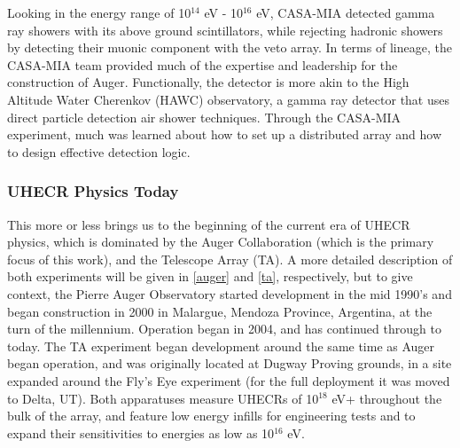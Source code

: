 Looking in the energy range of 10$^{14}$ eV - 10$^{16}$ eV, CASA-MIA detected gamma ray showers with its above ground scintillators, while rejecting hadronic showers by detecting their muonic component with the veto array. In terms of lineage, the CASA-MIA team provided much of the expertise and leadership for the construction of Auger. Functionally, the detector is more akin to the High Altitude Water Cherenkov (HAWC) observatory, a gamma ray detector that uses direct particle detection air shower techniques. Through the CASA-MIA experiment, much was learned about how to set up a distributed array and how to design effective detection logic. 

 
\subsubsection*{UHECR Physics Today}

This more or less brings us to the beginning of the current era of UHECR physics, which is dominated by the Auger Collaboration (which is the primary focus of this work), and the Telescope Array (TA). A more detailed description of both experiments will be given in \autoref{auger} and \autoref{ta}, respectively, but to give context, the Pierre Auger Observatory started development in the mid 1990's and began construction in 2000 in Malargue, Mendoza Province, Argentina, at the turn of the millennium. Operation began in 2004, and has continued through to today. The TA experiment began development around the same time as Auger began operation, and was originally located at Dugway Proving grounds, in a site expanded around the Fly's Eye experiment (for the full deployment it was moved to Delta, UT). Both apparatuses measure UHECRs of 10$^{18}$ eV+ throughout the bulk of the array, and feature low energy infills for engineering tests and to expand their sensitivities to energies as low as 10$^{16}$ eV.

